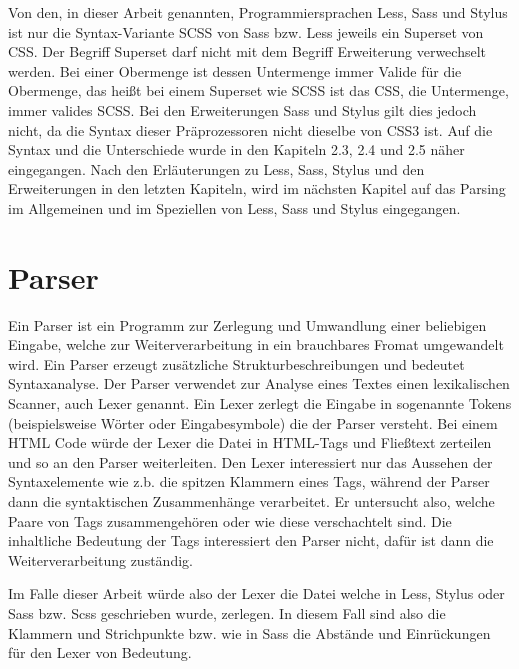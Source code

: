 Von den, in dieser Arbeit genannten, Programmiersprachen Less, Sass und Stylus ist nur die Syntax-Variante SCSS von Sass bzw. Less jeweils ein Superset von CSS. \newline
Der Begriff Superset darf nicht mit dem Begriff Erweiterung verwechselt werden.\newline
Bei einer Obermenge ist dessen Untermenge immer Valide für die Obermenge, das heißt bei einem Superset wie SCSS ist das CSS, die Untermenge, immer valides SCSS.\newline
Bei den Erweiterungen Sass und Stylus gilt dies jedoch nicht, da die Syntax dieser Präprozessoren nicht dieselbe von CSS3 ist. Auf die Syntax und die Unterschiede wurde in den Kapiteln 2.3, 2.4 und 2.5 näher eingegangen.\newline\newline
Nach den Erläuterungen zu Less, Sass, Stylus und den Erweiterungen in den letzten Kapiteln, wird im nächsten Kapitel auf das Parsing im Allgemeinen und im Speziellen von Less, Sass und Stylus eingegangen.

\section{Parser}
Ein Parser ist ein Programm zur Zerlegung und Umwandlung einer beliebigen Eingabe, welche zur Weiterverarbeitung in ein brauchbares Fromat umgewandelt wird. Ein Parser erzeugt zusätzliche Strukturbeschreibungen und bedeutet Syntaxanalyse. \newline
Der Parser verwendet zur Analyse eines Textes einen lexikalischen Scanner, auch Lexer genannt. Ein Lexer zerlegt die Eingabe in sogenannte Tokens (beispielsweise Wörter oder Eingabesymbole) die der Parser versteht. \newline
Bei einem HTML Code würde der Lexer die Datei in HTML-Tags und Fließtext zerteilen und so an den Parser weiterleiten. Den Lexer interessiert nur das Aussehen der Syntaxelemente wie z.b. die spitzen Klammern eines Tags, während der Parser dann die syntaktischen Zusammenhänge verarbeitet. Er untersucht also, welche Paare von Tags zusammengehören oder wie diese verschachtelt sind. Die inhaltliche Bedeutung der Tags interessiert den Parser nicht, dafür ist dann die Weiterverarbeitung zuständig.

Im Falle dieser Arbeit würde also der Lexer die Datei welche in Less, Stylus oder Sass bzw. Scss geschrieben wurde, zerlegen. In diesem Fall sind also die Klammern und Strichpunkte bzw. wie in Sass die Abstände und Einrückungen für den Lexer von Bedeutung.

